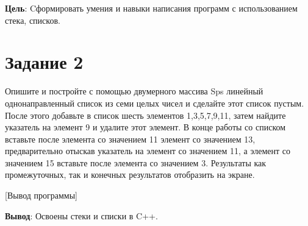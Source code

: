\documentclass{bsuir}
\begin{document}

\textbf{Цель}: Cформировать умения и навыки написания программ с использованием
стека, списков.

\section*{Задание 2}

Опишите и постройте с помощью двумерного массива Sps линейный однонаправленный
список из семи целых чисел и сделайте этот список пустым. После этого добавьте в
список шесть элементов 1,3,5,7,9,11, затем найдите указатель на элемент 9 и
удалите этот элемент. В конце работы со списком вставьте после элемента со
значением 11 элемент со значением 13, предварительно отыскав указатель на
элемент со значением 11, а элемент со значением 15 вставьте после элемента со
значением 3. Результаты как промежуточных, так и конечных результатов отобразить
на экране.


[Вывод программы]

\textbf{Вывод}: Освоены стеки и списки в C++.
\end{document}
